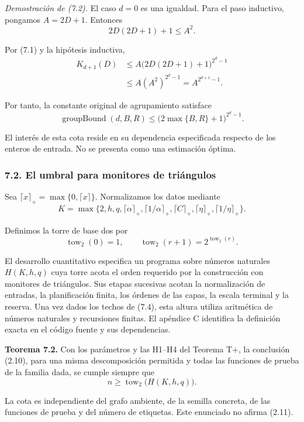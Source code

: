 \documentclass[spanish,11pt,a4paper]{article}
\begin{document}
\emph{Demostración de (7.2).} El caso \(d=0\) es una igualdad. Para el paso inductivo, pongamos \(A=2D+1\). Entonces
\[2D(2D+1)+1\leq A^2.\]

Por (7.1) y la hipótesis inductiva,
\[\begin{aligned}
K_{d+1}(D)
&\leq A\bigl(2D(2D+1)+1\bigr)^{2^d-1}\\
&\leq A(A^2)^{2^d-1}
=A^{2^{d+1}-1}.
\end{aligned}\]

Por tanto, la constante original de agrupamiento satisface
\[\operatorname{groupBound}(d,B,R)
\leq\bigl(2\max\{B,R\}+1\bigr)^{2^d-1}.                           \tag{7.3}\]

El interés de esta cota reside en su dependencia especificada respecto de los enteros de entrada. No se presenta como una estimación óptima.

\subsubsection{7.2. El umbral para monitores de triángulos}\label{el-umbral-para-monitores-de-triuxe1ngulos}

Sea \(\lceil x\rceil_+=\max\{0,\lceil x\rceil\}\). Normalizamos los datos mediante
\[K=\max\{2,h,q,\lceil\alpha\rceil_+,\lceil1/\alpha\rceil_+,
\lceil C\rceil_+,\lceil\eta\rceil_+,\lceil1/\eta\rceil_+\}.          \tag{7.4}\]

Definimos la torre de base dos por
\[\operatorname{tow}_2(0)=1,\qquad
\operatorname{tow}_2(r+1)=2^{\operatorname{tow}_2(r)}.                \tag{7.5}\]

El desarrollo cuantitativo especifica un programa sobre números naturales \(H(K,h,q)\) cuya torre acota el orden requerido por la construcción con monitores de triángulos. Sus etapas sucesivas acotan la normalización de entradas, la planificación finita, los órdenes de las capas, la escala terminal y la reserva. Una vez dados los techos de (7.4), esta altura utiliza aritmética de números naturales y recursiones finitas. El apéndice C identifica la definición exacta en el código fuente y sus dependencias.

\textbf{Teorema 7.2.} Con los parámetros y las H1--H4 del Teorema T+, la conclusión (2.10), para una misma descomposición permitida y todas las funciones de prueba de la familia dada, se cumple siempre que
\[n\geq\operatorname{tow}_2\bigl(H(K,h,q)\bigr).                     \tag{7.6}\]

La cota es independiente del grafo ambiente, de la semilla concreta, de las funciones de prueba y del número de etiquetas. Este enunciado no afirma (2.11).
\end{document}

